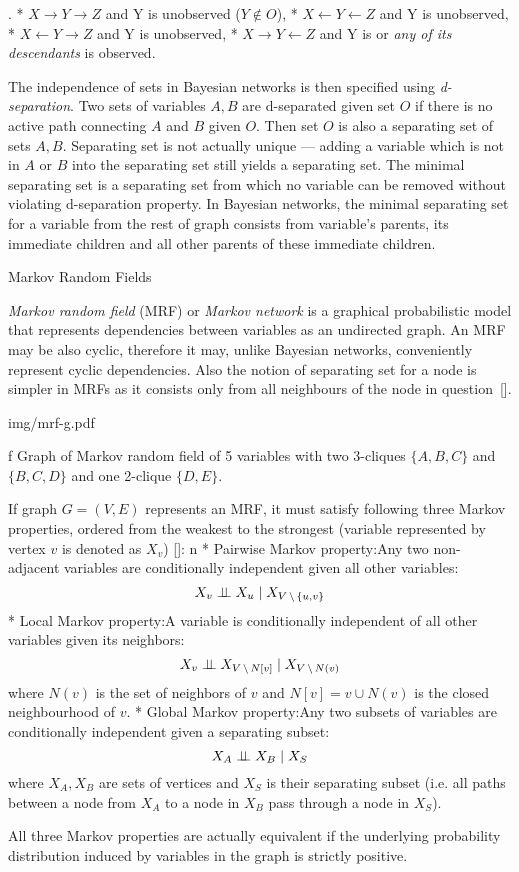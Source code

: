 \begitems \style .
* $X \rightarrow Y \rightarrow Z$ and Y is unobserved ($Y \not\in O$),
* $X \leftarrow Y \leftarrow Z$ and Y is unobserved,
* $X \leftarrow Y \rightarrow Z$ and Y is unobserved,
* $X \rightarrow Y \leftarrow Z$ and Y is or {\it any of its descendants} is observed.
\enditems
\par 
The independence of sets in Bayesian networks is then specified using {\it d-separation}. Two sets of variables $A,B$ are d-separated given set $O$ if there is no active path connecting $A$ and $B$ given $O$. Then set $O$ is also a separating set of sets $A,B$. Separating set is not actually unique --- adding a variable which is not in $A$ or $B$ into the separating set still yields a separating set. The minimal separating set is a separating set from which no variable can be removed without violating d-separation property. In Bayesian networks, the minimal separating set for a variable from the rest of graph consists from variable's parents, its immediate children and all other parents of these immediate children.

\secc Markov Random Fields
\par
{\it Markov random field} (MRF) or {\it Markov network} is a graphical probabilistic model that represents dependencies between variables as an undirected graph. An MRF may be also cyclic, therefore it may, unlike Bayesian networks, conveniently represent cyclic dependencies. Also the notion of separating set for a node is simpler in MRFs as it consists only from all neighbours of the node in question~[\rcite[Pearl1988]].

\topinsert {}
\picheight=4cm \cinspic  img/mrf-g.pdf
\caption/f Graph of Markov random field of 5 variables with two 3-cliques $\{A,B,C\}$ and $\{B,C,D\}$ and one 2-clique $\{D,E\}$.
\endinsert

\par If graph $G = (V,E)$ represents an MRF, it must satisfy following three Markov properties, ordered from the weakest to the strongest (variable represented by vertex $v$ is denoted as $X_v$) [\rcite[wikiMrf]]:
\begitems \style n
* {\sbf Pairwise Markov property}:\nl Any two non-adjacent variables are conditionally independent given all other variables:
$$ X_v \perp\!\!\!\perp X_u \mid X_{V\,\setminus\,\{u,v\}}$$
* {\sbf Local Markov property}:\nl A variable is conditionally independent of all other variables given its neighbors:
$$ X_v \perp\!\!\!\perp X_{V\,\setminus\,N[v]} \mid X_{V\,\setminus\,N(v)}$$
where $N(v)$ is the set of neighbors of $v$ and $N[v] = v \cup N(v)$ is the closed neighbourhood of $v$.
* {\sbf Global Markov property}:\nl Any two subsets of variables are conditionally independent given a separating subset:
$$ X_A \perp\!\!\!\perp X_B \mid X_S$$
where $X_A, X_B$ are sets of vertices and $X_S$ is their separating subset (i.e. all paths between a node from $X_A$ to a node in $X_B$ pass through a node in $X_S$).
\enditems
\par All three Markov properties are actually equivalent if the underlying probability distribution induced by variables in the graph is strictly positive.

